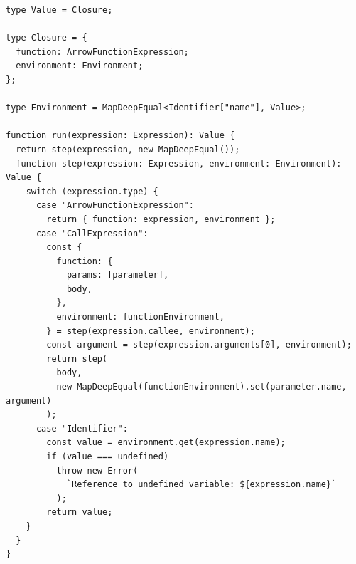 \documentclass[12pt, oneside]{book}
\begin{document}
\begin{verbatim}
type Value = Closure;

type Closure = {
  function: ArrowFunctionExpression;
  environment: Environment;
};

type Environment = MapDeepEqual<Identifier["name"], Value>;

function run(expression: Expression): Value {
  return step(expression, new MapDeepEqual());
  function step(expression: Expression, environment: Environment): Value {
    switch (expression.type) {
      case "ArrowFunctionExpression":
        return { function: expression, environment };
      case "CallExpression":
        const {
          function: {
            params: [parameter],
            body,
          },
          environment: functionEnvironment,
        } = step(expression.callee, environment);
        const argument = step(expression.arguments[0], environment);
        return step(
          body,
          new MapDeepEqual(functionEnvironment).set(parameter.name, argument)
        );
      case "Identifier":
        const value = environment.get(expression.name);
        if (value === undefined)
          throw new Error(
            `Reference to undefined variable: ${expression.name}`
          );
        return value;
    }
  }
}
\end{verbatim}
\end{document}
